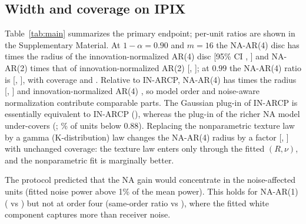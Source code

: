 \documentclass[journal]{IEEEtran}
\begin{document}
\subsection{Width and coverage on IPIX}
\begin{table}[!t]
\centering\small
\caption{IPIX results ($m=16$; rotations 2--3; \NUnitsConf{} session$\times$channel$\times$rotation units). Radius ratio: geometric mean over units of mean disc radius relative to IN-ARCP on the same test episodes, with 95\% day-cluster bootstrap interval. Max.\ dev.: mean over units of the largest absolute texture-quintile coverage deviation from nominal.}
\label{tab:main}
\resizebox{\textwidth}{!}{}
\end{table}
Table~\ref{tab:main} summarizes the primary endpoint; per-unit ratios are shown in the Supplementary Material. At $1-\alpha=0.90$ and $m=16$ the NA-AR(4) disc has \SameNAFourA{} times the radius of the innovation-normalized AR(4) disc [95\% CI \SameLoNAFourA, \SameHiNAFourA] and NA-AR(2) \SameNATwoA{} times that of innovation-normalized AR(2) [\SameLoNATwoA, \SameHiNATwoA]; at $0.99$ the NA-AR(4) ratio is \SameNAFourB{} [\SameLoNAFourB, \SameHiNAFourB], with coverage \CovNAFourmSixteenA{} and \CovNAFourmSixteenB. Relative to IN-ARCP, NA-AR(4) has \RatioNAFourmSixteenA{} times the radius [\RatioLoNAFourmSixteenA, \RatioHiNAFourmSixteenA] and innovation-normalized AR(4) \RatioINFourmSixteenA, so model order and noise-aware normalization contribute comparable parts. The Gaussian plug-in of IN-ARCP is essentially equivalent to IN-ARCP (\RatioGOnemSixteenA), whereas the plug-in of the richer NA model under-covers (\CovNAFourGmSixteenA; \BelowNAFourGmSixteenA\% of units below 0.88). Replacing the nonparametric texture law by a gamma (K-distribution) law changes the NA-AR(4) radius by a factor \BOneRatio{} [\BOneRatioLo, \BOneRatioHi] with unchanged coverage: the texture law enters only through the fitted $(R,\nu)$, and the nonparametric fit is marginally better.

The protocol predicted that the NA gain would concentrate in the \NNoisyConf{} noise-affected units (fitted noise power above 1\% of the mean power). This holds for NA-AR(1) (\NoisyNAOnemSixteenA{} vs \CleanNAOnemSixteenA) but not at order four (same-order ratio \SameNAFourNoisy{} vs \SameNAFourClean), where the fitted white component captures more than receiver noise.
\end{document}
